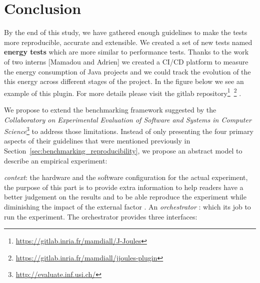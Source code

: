 
\section{Conclusion }
By the end of this study, we have gathered enough guidelines to make the tests more reproducible, accurate and extensible.
We created a set of new tests named \textbf{energy tests} which are more similar to performance tests.
Thanks to the work of two interns [Mamadou and Adrien] we created a CI/CD platform to measure the energy consumption of Java projects and we could track the evolution of the this energy across different stages of the project.
In the figure below we see an example of this plugin.
For more details please visit the gitlab repository\footnote{\url{https://gitlab.inria.fr/mamdiall/J-Joules}}~\footnote{\url{https://gitlab.inria.fr/mamdiall/jjoules-plugin}} .

We propose to extend the benchmarking framework suggested by the \emph{Collaboratory on Experimental Evaluation of Software and Systems in Computer Science}\footnote{\url{http://evaluate.inf.usi.ch/}} to address those limitations.
Instead of only presenting the four primary aspects of their guidelines that were mentioned previously in Section~\ref{sec:benchmarking_reproducibility}, we propose an abstract model to describe an empirical experiment:

\emph{context}: the hardware and the software configuration for the actual experiment, the purpose of this part is to provide extra information to help readers have a better judgement on the results and to be able reproduce the experiment while diminishing the impact of the external factor .
An \emph{orchestrator} : which its job to run the experiment.
The orchestrator provides three interfaces:

